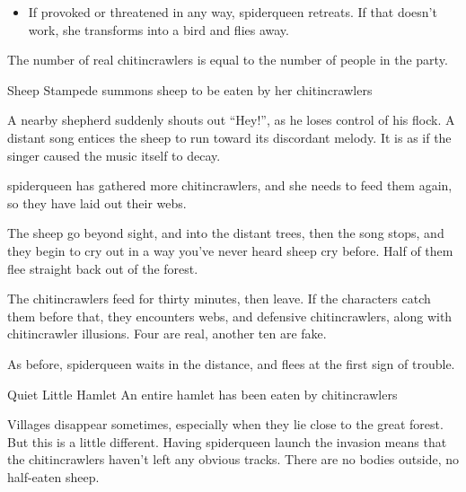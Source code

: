 \begin{multicols}{2}
\begin{itemize}
	\item{If provoked or threatened in any way, \gls{spiderqueen} retreats.  If that doesn't work, she transforms into a bird and flies away.}

\end{itemize}

The number of real chitincrawlers is equal to the number of people in the party.


{Sheep Stampede}%
{ summons sheep to be eaten by her chitincrawlers}%

\begin{boxtext}

	A nearby shepherd suddenly shouts out ``Hey!'', as he loses control of his flock.
	A distant song entices the sheep to run toward its discordant melody. It is as if the singer caused the music itself to decay.

\end{boxtext}

\noindent
\Gls{spiderqueen} has gathered more chitincrawlers, and she needs to feed them again, so they have laid out their webs.

\begin{boxtext}

	The sheep go beyond sight, and into the distant trees, then the song stops, and they begin to cry out in a way you've never heard sheep cry before.  Half of them flee straight back out of the forest.

\end{boxtext}

The chitincrawlers feed for thirty minutes, then leave.  If the characters catch them before that, they encounters webs, and defensive chitincrawlers, along with chitincrawler illusions.  Four are real, another ten are fake.

As before, \gls{spiderqueen} waits in the distance, and flees at the first sign of trouble.


{Quiet Little Hamlet}%
{An entire hamlet has been eaten by chitincrawlers}%


Villages disappear sometimes, especially when they lie close to the great forest.  But this is a little different.  Having \gls{spiderqueen} launch the invasion means that the chitincrawlers haven't left any obvious tracks.  There are no bodies outside, no half-eaten sheep.


\end{multicols}
